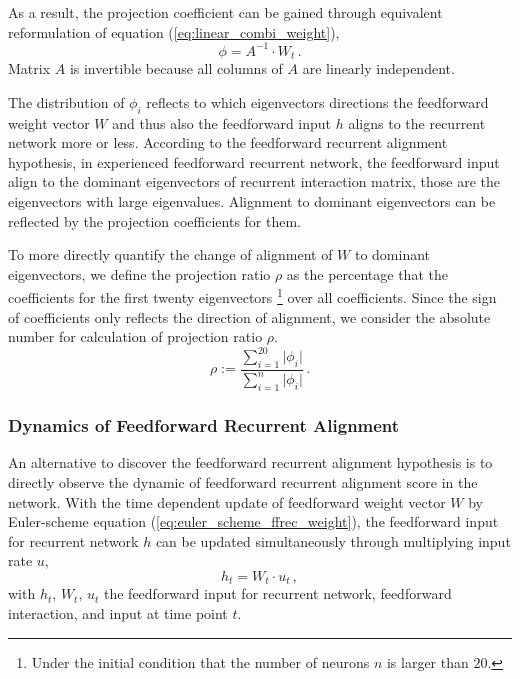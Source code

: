 \documentclass[11pt]{article}
\begin{document}
	As a result, the projection coefficient can be gained through equivalent reformulation of equation (\ref{eq:linear_combi_weight}), 
		\begin{equation}
			\phi = A^{-1} \cdot W_t \, .
		\end{equation}
	Matrix $A$ is invertible because all columns of $A$ are linearly independent. 
	
	The distribution of $\phi_i$ reflects to which eigenvectors directions the feedforward weight vector $W$ and thus also the feedforward input $h$ aligns to the recurrent network more or less. According to the feedforward recurrent alignment hypothesis, in experienced feedforward recurrent network, the feedforward input align to the dominant eigenvectors of recurrent interaction matrix, those are the eigenvectors with large eigenvalues. Alignment to dominant eigenvectors can be reflected by the projection coefficients for them. 
	
	To more directly quantify the change of alignment of $W$ to dominant eigenvectors, we define the projection ratio $\rho$ as the percentage that the coefficients for the first twenty eigenvectors \footnote{Under the initial condition that the number of neurons $n$ is larger than $20$. } over all coefficients. Since the sign of coefficients only reflects the direction of alignment, we consider the absolute number for calculation of projection ratio $\rho$.
		\begin{equation}
			\rho := \frac{\sum_{i=1}^{20} \vert \phi_i \vert}{\sum_{i=1}^{n} \vert \phi_i \vert} \, .
		\end{equation}
		
	\subsubsection{Dynamics of Feedforward Recurrent Alignment}
	
	An alternative to discover the feedforward recurrent alignment hypothesis is to directly observe the dynamic of feedforward recurrent alignment score in the network. With the time dependent update of feedforward weight vector $W$ by Euler-scheme equation (\ref{eq:euler_scheme_ffrec_weight}), the feedforward input for recurrent network $h$ can be updated simultaneously through multiplying input rate $u$, 
		\begin{equation}
			h_t = W_t \cdot u_t \, ,
		\end{equation}
	with $h_t,\, W_t, \, u_t$ the feedforward input for recurrent network, feedforward interaction, and input at time point $t$. 
	
\end{document}
